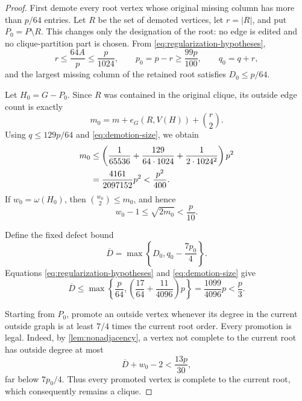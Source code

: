 \documentclass[11pt,reqno]{amsart}
\numberwithin{equation}{section}
\theoremstyle{definition}
\theoremstyle{remark}
\begin{document}
\begin{proof}
First demote every root vertex whose original missing column has more than
$p/64$ entries.  Let $R$ be the set of demoted vertices, let $r=|R|$, and put
$P_0=P\setminus R$.  This changes only the designation of the root: no edge is
edited and no clique-partition part is chosen.  From
\eqref{eq:regularization-hypotheses},
\begin{equation}\label{eq:demotion-size}
  r\leq\frac{64A}{p}\leq\frac p{1024},\qquad
  p_0=p-r\geq\frac{99p}{100},\qquad q_0=q+r,
\end{equation}
and the largest missing column of the retained root satisfies $D_0\leq p/64$.

Let $H_0=G-P_0$.  Since $R$ was contained in the original clique, its outside
edge count is exactly
\[
  m_0=m+e_G(R,V(H))+\binom r2.
\]
Using $q\leq129p/64$ and \eqref{eq:demotion-size}, we obtain
\begin{align}
  m_0
  &\leq \left(\frac1{65536}
      +\frac{129}{64\cdot1024}
      +\frac1{2\cdot1024^2}\right)p^2  \notag\\
  &=\frac{4161}{2097152}p^2
   <\frac{p^2}{400}.
  \label{eq:m0-bound}
\end{align}
If $w_0=\omega(H_0)$, then
$\binom{w_0}{2}\leq m_0$, and hence
\begin{equation}\label{eq:w0-bound}
  w_0-1\leq\sqrt{2m_0}<\frac p{10}.
\end{equation}

Define the fixed defect bound
\begin{equation}\label{eq:Dbar-definition}
  \overline D=\max\left\{D_0,q_0-\frac{7p_0}{4}\right\}.
\end{equation}
Equations \eqref{eq:regularization-hypotheses} and
\eqref{eq:demotion-size} give
\begin{equation}\label{eq:Dbar-bound}
  \overline D
  \leq\max\left\{\frac p{64},
        \left(\frac{17}{64}+\frac{11}{4096}\right)p\right\}
  =\frac{1099}{4096}p<\frac p3.
\end{equation}

Starting from $P_0$, promote an outside vertex whenever its degree in the
current outside graph is at least $7/4$ times the current root order.  Every
promotion is legal.  Indeed, by \cref{lem:nonadjacency}, a vertex not complete
to the current root has outside degree at most
\[
  \overline D+w_0-2<\frac{13p}{30},
\]
far below $7p_0/4$.  Thus every promoted vertex is complete to the current
root, which consequently remains a clique.


\end{proof}
\end{document}
